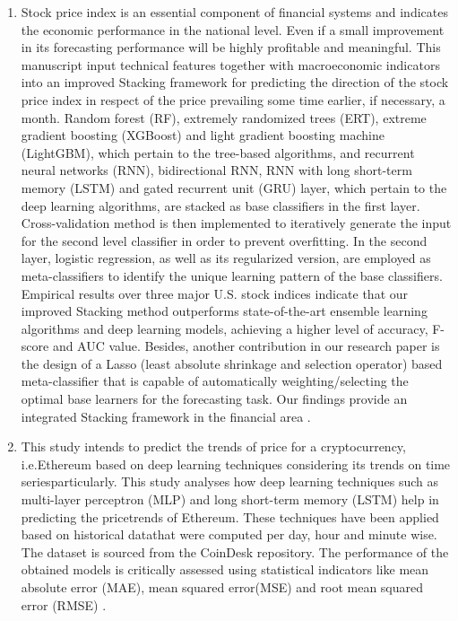\documentclass[12pt,journal,compsoc]{IEEEtran}
\begin{document}
\begin{enumerate}
	\item Stock price index is an essential component of financial systems and indicates the economic performance in the national level. Even if a small improvement in its forecasting performance will be highly profitable and meaningful. This manuscript input technical features together with macroeconomic indicators into an improved Stacking framework for predicting the direction of the stock price index in respect of the price prevailing some time earlier, if necessary, a month. Random forest (RF), extremely randomized trees (ERT), extreme gradient boosting (XGBoost) and light gradient boosting machine (LightGBM), which pertain to the tree-based algorithms, and recurrent neural networks (RNN), bidirectional RNN, RNN with long short-term memory (LSTM) and gated recurrent unit (GRU) layer, which pertain to the deep learning algorithms, are stacked as base classifiers in the first layer. Cross-validation method is then implemented to iteratively generate the input for the second level classifier in order to prevent overfitting. In the second layer, logistic regression, as well as its regularized version, are employed as meta-classifiers to identify the unique learning pattern of the base classifiers. Empirical results over three major U.S. stock indices indicate that our improved Stacking method outperforms state-of-the-art ensemble learning algorithms and deep learning models, achieving a higher level of accuracy, F-score and AUC value. Besides, another contribution in our research paper is the design of a Lasso (least absolute shrinkage and selection operator) based meta-classifier that is capable of automatically weighting/selecting the optimal base learners for the forecasting task. Our findings provide an integrated Stacking framework in the financial area \cite{jiang2020improved}.
	
	\item This study intends to predict the trends of price for a cryptocurrency, i.e.Ethereum based on deep learning techniques considering its trends on time seriesparticularly. This study analyses how deep learning techniques such as multi-layer perceptron (MLP) and long short-term memory (LSTM) help in predicting the pricetrends of Ethereum. These techniques have been applied based on historical datathat were computed per day, hour and minute wise. The dataset is sourced from the CoinDesk repository. The performance of the obtained models is critically assessed using statistical indicators like mean absolute error (MAE), mean squared error(MSE) and root mean squared error (RMSE) \cite{kumar2020predicting}.
	

\end{enumerate}
\end{document}
